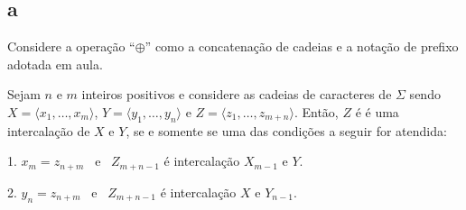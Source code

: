 \subsection{a} Considere a operação ``$\oplus$'' como a concatenação de cadeias e a notação de prefixo adotada em aula.

\begin{theorem}
    Sejam $n$ e $m$ inteiros positivos e considere as cadeias de caracteres de $\Sigma$ sendo $X = \langle x_1, \ldots, x_m \rangle$, $Y = \langle y_1, \ldots, y_n \rangle$ e $Z = \langle z_1, \ldots, z_{m + n} \rangle$. Então, $Z$ é é uma intercalação de $X$ e $Y$, se e somente se uma das condições a seguir for atendida:

    1. $x_m = z_{n + m}$ ~e~ $Z_{m + n - 1}$ é intercalação $X_{m - 1}$ e $Y$.

    2. $y_n = z_{n + m}$ ~e~ $Z_{m + n - 1}$ é intercalação $X$ e $Y_{n - 1}$.
\end{theorem}


